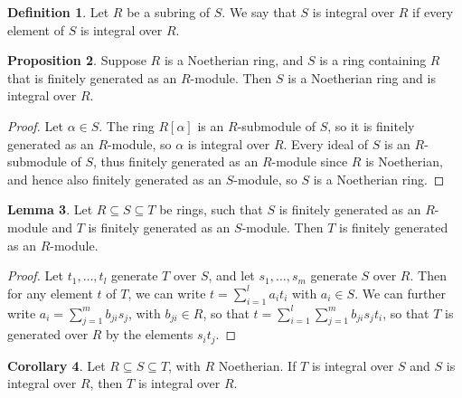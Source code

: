 \documentclass{article}
\renewcommand{\sb}[1]{\left[ #1 \right]}
\theoremstyle{definition}\newtheorem{definition}{Definition}[subsection]
\theoremstyle{definition}\newtheorem{remark}[definition]{Remark}
\theoremstyle{definition}\newtheorem*{example}{Example}
\theoremstyle{definition}\newtheorem*{note}{Note}
\newtheorem{proposition}[definition]{Proposition}
\newtheorem{lemma}[definition]{Lemma}
\newtheorem{corollary}[definition]{Corollary}
\begin{document}
\begin{definition}
Let $ R $ be a subring of $ S $. We say that $ S $ is integral over $ R $ if every element of $ S $ is integral over $ R $.
\end{definition}

\begin{proposition}
Suppose $ R $ is a Noetherian ring, and $ S $ is a ring containing $ R $ that is finitely generated as an $ R $-module. Then $ S $ is a Noetherian ring and is integral over $ R $.
\end{proposition}

\begin{proof}
Let $ \alpha \in S $. The ring $ R\sb{\alpha} $ is an $ R $-submodule of $ S $, so it is finitely generated as an $ R $-module, so $ \alpha $ is integral over $ R $. Every ideal of $ S $ is an $ R $-submodule of $ S $, thus finitely generated as an $ R $-module since $ R $ is Noetherian, and hence also finitely generated as an $ S $-module, so $ S $ is a Noetherian ring.
\end{proof}

\begin{lemma}
\label{lem:10.1.5}
Let $ R \subseteq S \subseteq T $ be rings, such that $ S $ is finitely generated as an $ R $-module and $ T $ is finitely generated as an $ S $-module. Then $ T $ is finitely generated as an $ R $-module.
\end{lemma}

\begin{proof}
Let $ t_1, \dots, t_l $ generate $ T $ over $ S $, and let $ s_1, \dots, s_m $ generate $ S $ over $ R $. Then for any element $ t $ of $ T $, we can write $ t = \sum_{i = 1}^l a_it_i $ with $ a_i \in S $. We can further write $ a_i = \sum_{j = 1}^m b_{ji}s_j $, with $ b_{ji} \in R $, so that $ t = \sum_{i = 1}^l \sum_{j = 1}^m b_{ji}s_jt_i $, so that $ T $ is generated over $ R $ by the elements $ s_it_j $.
\end{proof}

\begin{corollary}
Let $ R \subseteq S \subseteq T $, with $ R $ Noetherian. If $ T $ is integral over $ S $ and $ S $ is integral over $ R $, then $ T $ is integral over $ R $.
\end{corollary}
\end{document}
